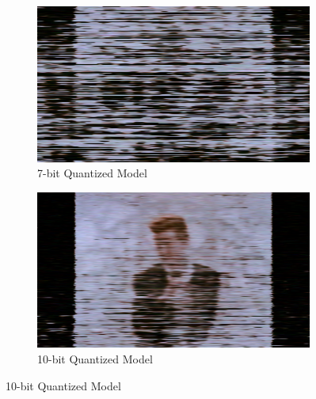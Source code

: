\begin{figure}[H]
        \begin{subfigure}[b]{0.4\textwidth}
            \centering
            \includegraphics[width=\textwidth]{assets/quantization/frames/rickq7.png}
            \caption{7-bit Quantized Model}
            \label{fig:rickq7}
        \end{subfigure}
        \begin{subfigure}[b]{0.4\textwidth}
            \centering
            \includegraphics[width=\textwidth]{assets/quantization/frames/rickq10.png}
            \caption{10-bit Quantized Model}
            \label{fig:rickq10}
        \end{subfigure}
    

\end{figure}
